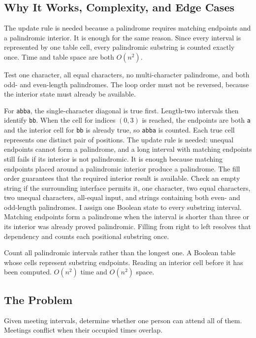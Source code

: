 \subsection{Why It Works, Complexity, and Edge Cases}
The update rule is needed because a palindrome requires matching endpoints
and a palindromic interior. It is enough for the same reason. Since every
interval is represented by one table cell, every palindromic substring is
counted exactly once. Time and table space are both \(O(n^2)\).

Test one character, all equal characters, no multi-character palindrome, and
both odd- and even-length palindromes. The loop order must not be reversed,
because the interior state must already be available.

\lessonexpansion
  {For \texttt{abba}, the single-character diagonal is true first. Length-two
   intervals then identify \texttt{bb}. When the cell for indices \((0,3)\)
   is reached, the endpoints are both \texttt{a} and the interior cell for
   \texttt{bb} is already true, so \texttt{abba} is counted. Each true cell
   represents one distinct pair of positions.}
  {The update rule is needed: unequal endpoints cannot form a palindrome,
   and a long interval with matching endpoints still fails if its interior is
   not palindromic. It is enough because matching endpoints placed around
   a palindromic interior produce a palindrome. The fill order guarantees that
   the required interior result is available.}
  {Check an empty string if the surrounding interface permits it, one
   character, two equal characters, two unequal characters, all-equal input,
   and strings containing both even- and odd-length palindromes.}
  {I assign one Boolean state to every substring interval. Matching endpoints
   form a palindrome when the interval is shorter than three or its interior
   was already proved palindromic. Filling from right to left resolves that
   dependency and counts each positional substring once.}

\chaptercheckpoint
  {Count all palindromic intervals rather than the longest one.}
  {A Boolean table whose cells represent substring endpoints.}
  {Reading an interior cell before it has been computed.}
  {$O(n^2)$ time and $O(n^2)$ space.}



\subsection{The Problem}
Given meeting intervals, determine whether one person can attend all of them.
Meetings conflict when their occupied times overlap.

